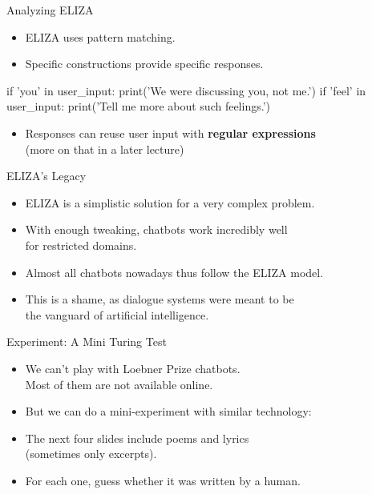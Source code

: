 \documentclass[xcolor={usenames,svgnames,x11names,dvipsnames,table}]{beamer}
\begin{document}
\begin{frame}[fragile]{Analyzing ELIZA}
    \begin{itemize}
        \item ELIZA uses pattern matching.
        \item Specific constructions provide specific responses.
    \end{itemize}
    \begin{example}
\begin{pythoncode}
    if 'you' in user_input:
        print('We were discussing you, not me.')
    if 'feel' in user_input:
        print('Tell me more about such feelings.')
\end{pythoncode}
    \end{example}
    \begin{itemize}
        \item Responses can reuse user input with \textbf{regular expressions}\\
              (more on that in a later lecture)
    \end{itemize}
\end{frame}

\begin{frame}{ELIZA's Legacy}
    \begin{itemize}
        \item ELIZA is a simplistic solution for a very complex problem.
        \item With enough tweaking, chatbots work incredibly well\\
            for restricted domains.
        \item Almost all chatbots nowadays thus follow the ELIZA model.
        \item This is a shame, as dialogue systems were meant to be\\
            the vanguard of artificial intelligence.
    \end{itemize}
\end{frame}

\begin{frame}{Experiment: A Mini Turing Test}
    \begin{itemize}
        \item We can't play with Loebner Prize chatbots.\\
              Most of them are not available online.
        \item But we can do a mini-experiment with similar technology:\\
        \item The next four slides include poems and lyrics\\
              (sometimes only excerpts).
        \item For each one, guess whether it was written by a human.
    \end{itemize}
\end{frame}
\end{document}

